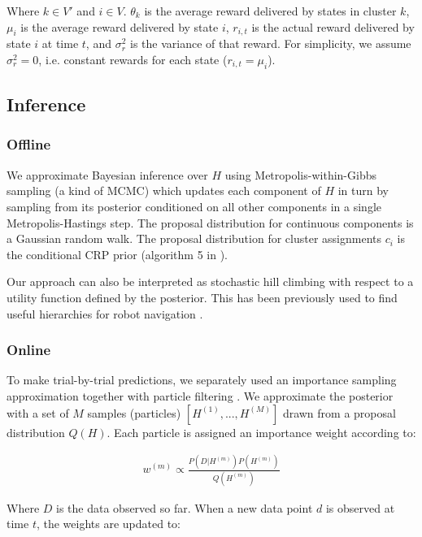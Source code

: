 \documentclass[11pt]{article}
\begin{document}
Where $k \in V'$ and $i \in V$. $\theta_k$ is the average reward delivered by states in cluster $k$, $\mu_i$ is the average reward delivered by state $i$, $r_{i,t}$ is the actual reward delivered by state $i$ at time $t$, and $\sigma_r^2$ is the variance of that reward. For simplicity, we assume $\sigma_r^2 = 0$, i.e. constant rewards for each state ($r_{i,t} = \mu_i$).

\subsection{Inference}

\subsubsection{Offline}

We approximate Bayesian inference over $H$ using Metropolis-within-Gibbs sampling \cite{roberts2009examples} (a kind of MCMC) which updates each component of $H$ in turn by sampling from its posterior conditioned on all other components in a single Metropolis-Hastings step. The proposal distribution for continuous components is a Gaussian random walk. The proposal distribution for cluster assignments $c_i$ is the conditional CRP prior (algorithm 5 in \cite{neal2000markov}).

Our approach can also be interpreted as stochastic hill climbing with respect to a utility function defined by the posterior. This has been previously used to find useful hierarchies for robot navigation \cite{fernandez2013multi}.

\subsubsection{Online}

To make trial-by-trial predictions, we separately used an importance sampling \cite{robert2004casella} approximation together with particle filtering \cite{doucet2001introduction, thaker2017online}. We approximate the posterior with a set of $M$ samples (particles) $[H^{(1)}, ..., H^{(M)}]$ drawn from a proposal distribution $Q(H)$. Each particle is assigned an importance weight according to:

\begin{align}
    w^{(m)} \propto \frac{P(D|H^{(m)}) P(H^{(m)})}{Q(H^{(m)})}
\end{align}

Where $D$ is the data observed so far. When a new data point $d$ is observed at time $t$, the weights are updated to:
\end{document}

